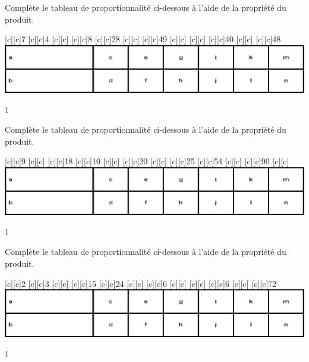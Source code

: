 \documentclass[a4paper,11pt]{report}
\begin{document}
\begin{exop}{
Complète le tableau de proportionnalité ci-dessous à l'aide de la propriété du produit.
\begin{center}
[c][c]{7}
[c][c]{4}
[c][c]{}
[c][c]{8}
[c][c]{28}
[c][c]{}
[c][c]{49}
[c][c]{}
[c][c]{}
[c][c]{40}
[c][c]{}
[c][c]{48}
\includegraphics[scale=.9]{media/fa-30/tableaut.eps}
\end{center}
\vspace{-0.5cm}}{1}
\end{exop}
\begin{exop}{
Complète le tableau de proportionnalité ci-dessous à l'aide de la propriété du produit.
\begin{center}
[c][c]{9}
[c][c]{}
[c][c]{18}
[c][c]{10}
[c][c]{}
[c][c]{20}
[c][c]{}
[c][c]{25}
[c][c]{54}
[c][c]{}
[c][c]{90}
[c][c]{}
\includegraphics[scale=.9]{media/fa-30/tableaut.eps}
\end{center}
\vspace{-0.5cm}}{1}
\end{exop}
\begin{exop}{
Complète le tableau de proportionnalité ci-dessous à l'aide de la propriété du produit.
\begin{center}
[c][c]{2}
[c][c]{3}
[c][c]{}
[c][c]{15}
[c][c]{24}
[c][c]{}
[c][c]{6}
[c][c]{}
[c][c]{}
[c][c]{6}
[c][c]{}
[c][c]{72}
\includegraphics[scale=.9]{media/fa-30/tableaut.eps}
\end{center}
\vspace{-0.5cm}}{1}
\end{exop}
\end{document}
